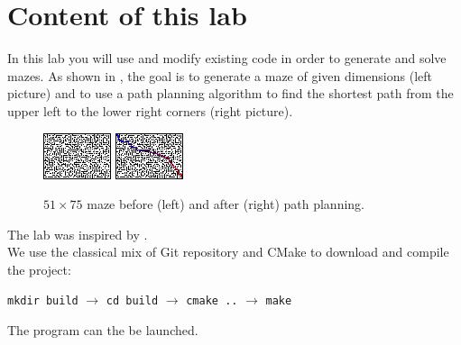 \documentclass{ecnreport}
\begin{document}


\newcommand{\involves}[1]{
\item {\bf C++ skills:} #1
}

\newcommand{\aitip}[1]{
\item {\bf AI tips:} #1
}

\section{Content of this lab}

In this lab you will use and modify existing code in order to generate and solve mazes. As shown in , the goal is to generate 
a maze of given dimensions (left picture) and to use a path planning algorithm to find the shortest path from the upper left to the lower right corners (right picture).

\begin{figure}[h]\centering
\includegraphics[width=.4\linewidth]{maze} \quad \quad\includegraphics[width=.4\linewidth]{maze_cell}
\caption{$51\times 75$ maze before (left) and after (right) path planning.}
\label{maze2}
\end{figure}

The lab was inspired by .\\

We use the classical mix of Git repository and CMake to download and compile the project:
\begin{center}
 \texttt{mkdir build} $\rightarrow$ \texttt{cd build} $\rightarrow$ \texttt{cmake ..} $\rightarrow$ \texttt{make}
\end{center}
The program can the be launched.
\end{document}
